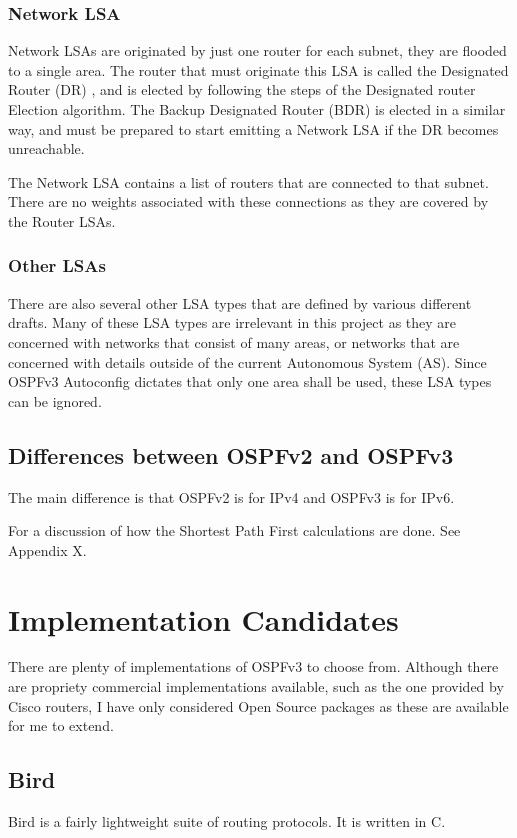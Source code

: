 \documentclass[12pt]{report}
\begin{document}
\subsubsection{Network LSA}
Network LSAs are originated by just one router for each subnet, they are
flooded to a single area. The router that must originate this LSA is called the
Designated Router (DR) , and is elected
by following the steps of the Designated router Election algorithm. The Backup
Designated Router (BDR)  is
elected in a similar way, and must be prepared to start emitting a Network LSA
if the DR becomes unreachable. 

The Network LSA contains a list of routers that are connected to that subnet.
There are no weights associated with these connections as they are covered by
the Router LSAs. 

\subsubsection{Other LSAs}
There are also several other LSA types that are defined by various different
drafts.  Many of these LSA types are irrelevant in this project as they are
concerned with networks that consist of many areas, or networks that are
concerned with details outside of the current Autonomous System (AS). Since
OSPFv3 Autoconfig dictates that only one area shall be used, these LSA types
can be ignored.   

\subsection{Differences between OSPFv2 and OSPFv3}
The main difference is that OSPFv2 is for IPv4 and OSPFv3 is for IPv6. 

For a discussion of how the Shortest Path First calculations are done. See
Appendix X. 

\section{Implementation Candidates}
There are plenty of implementations of OSPFv3 to choose from. Although there
are propriety commercial implementations available, such as the one provided by
Cisco routers, I have only considered Open Source packages as these are
available for me to extend.

\subsection{Bird}
Bird is a fairly lightweight suite of routing protocols. It is written in C. 
\end{document}
